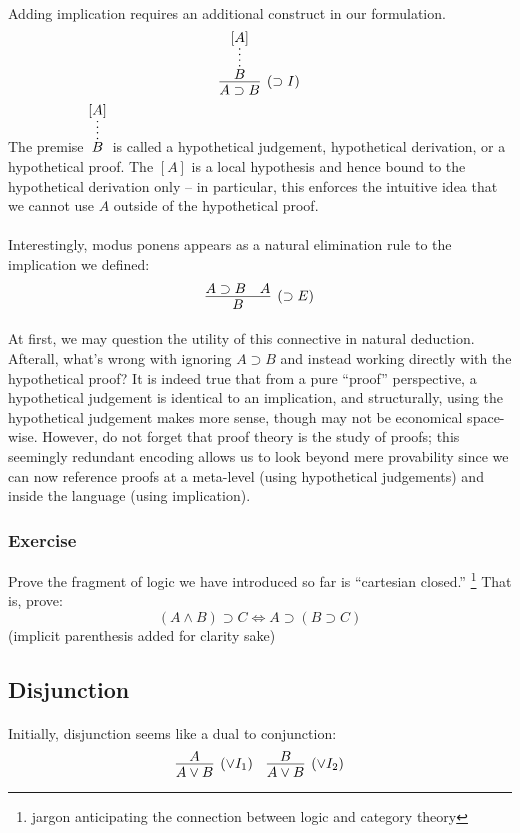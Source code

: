 \documentclass[a4paper]{article}
\begin{document}
\paragraph{}
Adding implication requires an additional construct in our formulation.
$$\infer[(\supset I)]{A \supset B}{\infer*{B}{[A]}}$$
The premise $\infer*{B}{[A]}$ is called a hypothetical judgement, hypothetical
derivation, or a hypothetical proof. The $[A]$ is a local hypothesis and hence
bound to the hypothetical derivation only -- in particular, this enforces the
intuitive idea that we cannot use $A$ outside of the hypothetical proof.

\paragraph{}
Interestingly, modus ponens appears as a natural elimination rule to the
implication we defined:
$$\infer[(\supset E)]{B}{A \supset B & A}$$

\paragraph{}
At first, we may question the utility of this connective in natural deduction.
Afterall, what's wrong with ignoring $A \supset B$ and instead working directly
with the hypothetical proof? It is indeed true that from a pure ``proof''
perspective, a hypothetical judgement is identical to an implication, and
structurally, using the hypothetical judgement makes more sense, though may not
be economical space-wise. However, do not forget that proof theory is the study
of proofs; this seemingly redundant encoding allows us to look beyond
mere provability since we can now reference proofs at a meta-level (using
hypothetical judgements) and inside the language (using implication).

\subsubsection{Exercise}
Prove the fragment of logic we have introduced so far is ``cartesian closed.''
\footnote{jargon anticipating the connection between logic and category theory}
That is, prove:
$$(A \land B) \supset C \Leftrightarrow A \supset (B \supset C)$$
(implicit parenthesis added for clarity sake)

\subsection{Disjunction}
\paragraph{}
Initially, disjunction seems like a dual to conjunction:
\[
  \infer[(\lor I_1)]{A \lor B}{A} \quad
  \infer[(\lor I_2)]{A \lor B}{B}
\]
\end{document}
